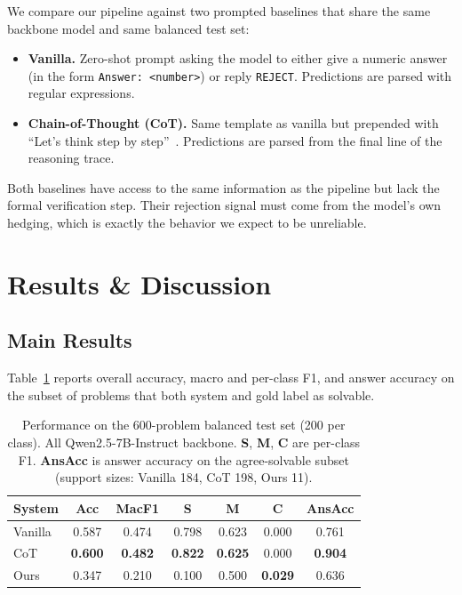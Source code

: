 \documentclass[sigconf, nonacm, onecolumn]{acmart}
\begin{document}
We compare our pipeline against two prompted baselines that share the
same backbone model and same balanced test set:

\begin{itemize}
  \item \textbf{Vanilla.} Zero-shot prompt asking the model to either
  give a numeric answer (in the form \texttt{Answer: <number>}) or reply
  \texttt{REJECT}. Predictions are parsed with regular expressions.
  \item \textbf{Chain-of-Thought (CoT).} Same template as vanilla but
  prepended with ``Let's think step by step''~\cite{kojima2022}.
  Predictions are parsed from the final line of the reasoning trace.
\end{itemize}

Both baselines have access to the same information as the pipeline but
lack the formal verification step. Their rejection signal must come from
the model's own hedging, which is exactly the behavior we expect to be
unreliable.

\section{Results \& Discussion}

\subsection{Main Results}

Table~\ref{tab:main} reports overall accuracy, macro and per-class F1,
and answer accuracy on the subset of problems that both system and gold
label as solvable.

\begin{table}[t]
  \centering
  \footnotesize
  \setlength{\tabcolsep}{3pt}
  \caption{Performance on the 600-problem balanced test set (200 per
  class). All Qwen2.5-7B-Instruct backbone. \textbf{S}, \textbf{M},
  \textbf{C} are per-class F1. \textbf{AnsAcc} is answer accuracy on
  the agree-solvable subset (support sizes: Vanilla 184, CoT 198,
  Ours 11).}
  \label{tab:main}
  \begin{tabular}{lcccccc}
    \toprule
    System & Acc & MacF1 & S & M & C & AnsAcc \\
    \midrule
    Vanilla    & 0.587 & 0.474 & 0.798 & 0.623 & 0.000          & 0.761 \\
    CoT        & \textbf{0.600} & \textbf{0.482} & \textbf{0.822} & \textbf{0.625} & 0.000 & \textbf{0.904} \\
    Ours       & 0.347 & 0.210 & 0.100 & 0.500 & \textbf{0.029} & 0.636 \\
    \bottomrule
  \end{tabular}
\end{table}
\end{document}
